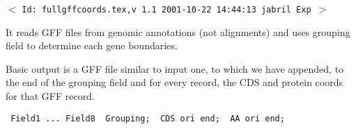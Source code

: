 \documentclass[11pt]{article}
\let\nwdocspar=\par                    %
\begin{document}
%

\newpage %
\setcounter{page}{1}
\pagestyle{fancy}
\renewcommand{\sectionmark}[1]{\markboth{}{\thesection.\ #1}}
\renewcommand{\subsectionmark}[1]{\markboth{}{\thesubsection.\ \textsl{#1}}}

\tableofcontents
\listoftables
\listoffigures

\vfill
\begin{center}
{\small$<$ \verb$Id: fullgffcoords.tex,v 1.1 2001-10-22 14:44:13 jabril Exp $$>$ }
\end{center}


\newpage %
\setcounter{page}{1}



\label{todo:AAA}\label{todo:AAB}
\nwenddocs{}%
%
%
\nwdocspar
\nwenddocs{}%
%
%
\nwdocspar
\todo{ \item \todoAAA 
       \item \todoAAB } %


It reads GFF files from genomic annotations (not alignments) and uses grouping field to determine each gene boundaries.


Basic output is a GFF file similar to input one, to which we have appended, to the end of the grouping field and for every record, the CDS and protein coords for that GFF record.

{\tt{}\ Field{}1\ ...\ Field{}8\ \ Grouping;\ \ CDS\ ori\ end;\ \ AA\ ori\ end;}



\begin{itemize}
 
\end{itemize}

\newpage %

\end{document}
